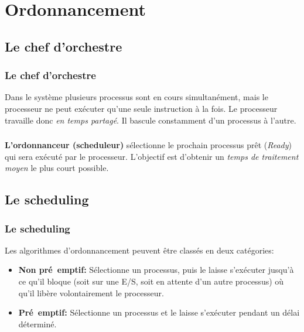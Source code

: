 \documentclass[svgnames,11pt]{beamer}
\begin{document}
\section{Ordonnancement}
\subsection{Le chef d'orchestre}
\begin{frame}
    \frametitle{Le chef d'orchestre}

    
    Dans le système plusieurs processus sont en cours simultanément, mais le processeur ne peut exécuter qu’une seule instruction à la fois. Le processeur travaille donc \emph{en temps partagé}. Il bascule constamment d’un processus à l’autre.

\end{frame}
\begin{frame}
    \frametitle{}

    \begin{aretenir}[]
        \textbf{L'ordonnanceur (scheduleur)} sélectionne le prochain processus prêt (\emph{Ready}) qui sera exécuté par le processeur. L'objectif est d'obtenir un \emph{temps de traitement moyen} le plus court possible.
    \end{aretenir}

\end{frame}
\subsection{Le scheduling}
\begin{frame}
    \frametitle{Le scheduling}

    Les algorithmes d’ordonnancement peuvent être classés en deux catégories:
    \begin{itemize}
    \item<1-> \textbf{Non pré~emptif:} Sélectionne un processus, puis le laisse s’exécuter jusqu’à ce qu’il bloque (soit sur une E/S, soit en attente d’un autre processus) où qu’il libère volontairement le processeur.
    \item<2-> \textbf{Pré~emptif:} Sélectionne un processus et le laisse s’exécuter pendant un délai déterminé.
    \end{itemize}

\end{frame}
\end{document}
